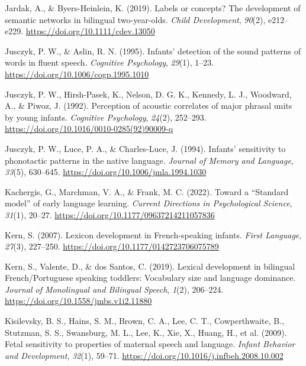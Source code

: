 \documentclass[
  12pt,
  b5paperpaper,
  twoside]{scrreprt}
\newlength{\cslhangindent}
\newlength{\cslentryspacingunit} %
\newenvironment{CSLReferences}[2] %
 {%
  \setlength{\parindent}{0pt}
  \ifodd #1
  \let\oldpar\par
  \def\par{\hangindent=\cslhangindent\oldpar}
  \fi
  \setlength{\parskip}{#2\cslentryspacingunit}
 }%
 {}
\begin{document}
\begin{CSLReferences}{1}{0}
\leavevmode{}%
Jardak, A., \& Byers-Heinlein, K. (2019). Labels or concepts? {The}
development of semantic networks in bilingual two-year-olds. \emph{Child
Development}, \emph{90}(2), e212--e229.
\url{https://doi.org/10.1111/cdev.13050}

\leavevmode{}%
Jusczyk, P. W., \& Aslin, R. N. (1995). Infants' detection of the sound
patterns of words in fluent speech. \emph{Cognitive Psychology},
\emph{29}(1), 1--23. \url{https://doi.org/10.1006/cogp.1995.1010}

\leavevmode{}%
Jusczyk, P. W., Hirsh-Pasek, K., Nelson, D. G. K., Kennedy, L. J.,
Woodward, A., \& Piwoz, J. (1992). Perception of acoustic correlates of
major phrasal units by young infants. \emph{Cognitive Psychology},
\emph{24}(2), 252--293.
\url{https://doi.org/10.1016/0010-0285(92)90009-q}

\leavevmode{}%
Jusczyk, P. W., Luce, P. A., \& Charles-Luce, J. (1994). Infants'
sensitivity to phonotactic patterns in the native language.
\emph{Journal of Memory and Language}, \emph{33}(5), 630--645.
\url{https://doi.org/10.1006/jmla.1994.1030}

\leavevmode{}%
Kachergis, G., Marchman, V. A., \& Frank, M. C. (2022). Toward a
{``{Standard} model''} of early language learning. \emph{Current
Directions in Psychological Science}, \emph{31}(1), 20--27.
\url{https://doi.org/10.1177/09637214211057836}

\leavevmode{}%
Kern, S. (2007). Lexicon development in {French-speaking} infants.
\emph{First Language}, \emph{27}(3), 227--250.
\url{https://doi.org/10.1177/0142723706075789}

\leavevmode{}%
Kern, S., Valente, D., \& dos Santos, C. (2019). Lexical development in
bilingual {French}/{Portuguese} speaking toddlers: Vocabulary size and
language dominance. \emph{Journal of Monolingual and Bilingual Speech},
\emph{1}(2), 206--224. \url{https://doi.org/10.1558/jmbs.v1i2.11880}

\leavevmode{}%
Kisilevsky, B. S., Hains, S. M., Brown, C. A., Lee, C. T.,
Cowperthwaite, B., Stutzman, S. S., Swansburg, M. L., Lee, K., Xie, X.,
Huang, H., et al. (2009). Fetal sensitivity to properties of maternal
speech and language. \emph{Infant Behavior and Development},
\emph{32}(1), 59--71. \url{https://doi.org/10.1016/j.infbeh.2008.10.002}


\end{CSLReferences}
\end{document}

